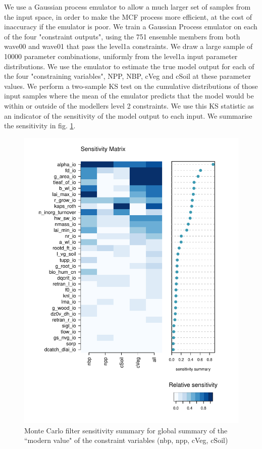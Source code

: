 \documentclass[gmd, manuscript]{copernicus}
\begin{document}
We use a Gaussian process emulator to allow a much larger set of samples from the input space, in order to make the MCF process more efficient, at the cost of inaccuracy if the emulator is poor. We train a Gaussian Process emulator on each of the four "constraint outputs", using the 751 ensemble members from both wave00 and wave01 that pass the level1a constraints. We draw a large sample of 10000 parameter combinations, uniformly from the level1a input parameter distributions. We use the emulator to estimate the true model output for each of the four "constraining variables", NPP, NBP, cVeg and cSoil at these parameter values. We perform a two-sample KS test on the cumulative distributions of those input samples where the mean of the emulator predicts that the model would be within or outside of the modellers level 2 constraints. We use this KS statistic as an indicator of the sensitivity of the model output to each input. We summarise the sensitivity in fig. \ref{fig:MCF_sensmat_Yconst_level1a_wave01}.

\begin{figure}[t]
\includegraphics[width=12cm]{./graphics/MCF_sensmat_Yconst_level1a_wave01}
\caption{Monte Carlo filter sensitivity summary for global summary of the ``modern value" of the constraint variables (nbp, npp, cVeg, cSoil)}
\label{fig:MCF_sensmat_Yconst_level1a_wave01}
\end{figure}
\end{document}
